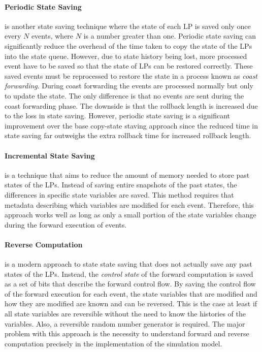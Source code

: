 \documentclass[11pt]{book}
\begin{document}
\paragraph{Periodic State Saving} is another state saving technique where the state of each LP is
saved only once every $N$ events, where $N$ is a number greater than one.  Periodic state saving can
significantly reduce the overhead of the time taken to copy the state of the LPs into the state
queue.  However, due to state history being lost, more processed event have to be saved so that the
state of LPs can be restored correctly.  These saved events must be reprocessed to restore the state
in a process known as \emph{coast forwarding}.  During coast forwarding the events are processed
normally but only to update the state.  The only difference is that no events are sent during the
coast forwarding phase.  The downside is that the rollback length is increased due to the loss in
state saving.  However, periodic state saving is a significant improvement over the base copy-state
staving approach since the reduced time in state saving far outweighs the extra rollback time for
increased rollback length.

\paragraph{Incremental State Saving} is a technique that aims to reduce the amount of memory needed
to store past states of the LPs.  Instead of saving entire snapshots of the past states, the
differences in specific state variables are saved.  This method requires that metadata describing
which variables are modified for each event.  Therefore, this approach works well as long as only a
small portion of the state variables change during the forward execution of events.

\paragraph{Reverse Computation} \cite{carothers-99a} is a modern approach to state state saving that
does not actually save any past states of the LPs.  Instead, the \emph{control state} of the forward
computation is saved as a set of bits that describe the forward control flow.  By saving the control
flow of the forward execution for each event, the state variables that are modified and how they are
modified are known and can be reversed.  This is the case at least if all state variables are
reversible without the need to know the histories of the variables.  Also, a reversible random
number generator is required.  The major problem with this approach is the necessity to understand
forward and reverse computation precisely in the implementation of the simulation model.
\end{document}
